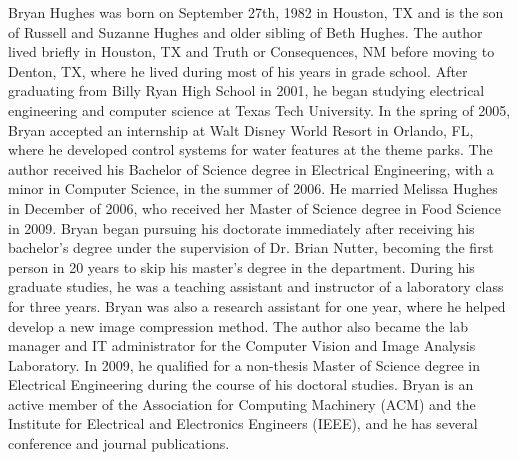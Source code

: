 Bryan Hughes was born on September 27th, 1982 in Houston, TX and is the son of Russell and Suzanne Hughes and older sibling of Beth Hughes. The author lived briefly in Houston, TX and Truth or Consequences, NM before moving to Denton, TX, where he lived during most of his years in grade school. After graduating from Billy Ryan High School in 2001, he began studying electrical engineering and computer science at Texas Tech University. In the spring of 2005, Bryan accepted an internship at Walt Disney World Resort in Orlando, FL, where he developed control systems for water features at the theme parks. The author received his Bachelor of Science degree in Electrical Engineering, with a minor in Computer Science, in the summer of 2006. He married Melissa Hughes in December of 2006, who received her Master of Science degree in Food Science in 2009. Bryan began pursuing his doctorate immediately after receiving his bachelor's degree under the supervision of Dr. Brian Nutter, becoming the first person in 20 years to skip his master's degree in the department. During his graduate studies, he was a teaching assistant and instructor of a laboratory class for three years. Bryan was also a research assistant for one year, where he helped develop a new image compression method. The author also became the lab manager and IT administrator for the Computer Vision and Image Analysis Laboratory. In 2009, he qualified for a non-thesis Master of Science degree in Electrical Engineering during the course of his doctoral studies. Bryan is an active member of the Association for Computing Machinery (ACM) and the Institute for Electrical and Electronics Engineers (IEEE), and he has several conference and journal publications.